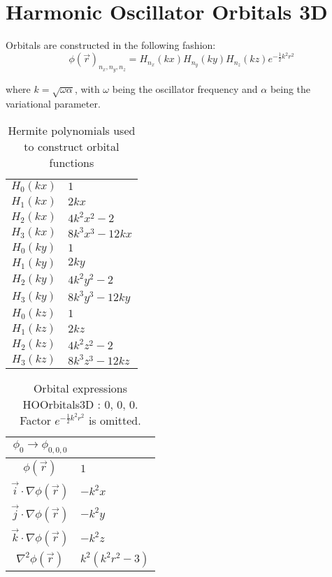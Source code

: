 \chapter{Harmonic Oscillator Orbitals 3D}
\label{appendix:SymPyHO3D}

Orbitals are constructed in the following fashion:
\begin{equation*}
\phi(\vec r)_{n_x, n_y, n_z} = H_{n_x}(kx)H_{n_y}(ky)H_{n_z}(kz)e^{-\frac{1}{2}k^2r^2}
\end{equation*}   

where $k = \sqrt{\omega\alpha}$, with $\omega$ being the oscillator frequency and $\alpha$ being the variational parameter.  


\begin{table}
\begin{center}
\begin{tabular}{c|l}
$H_{0}(kx)$ & $1$\\
$H_{1}(kx)$ & $2 k x$\\
$H_{2}(kx)$ & $4 k^{2} x^{2} -2$\\
$H_{3}(kx)$ & $8 k^{3} x^{3} - 12 k x$\\
\hline
$H_{0}(ky)$ & $1$\\
$H_{1}(ky)$ & $2 k y$\\
$H_{2}(ky)$ & $4 k^{2} y^{2} -2$\\
$H_{3}(ky)$ & $8 k^{3} y^{3} - 12 k y$\\
\hline
$H_{0}(kz)$ & $1$\\
$H_{1}(kz)$ & $2 k z$\\
$H_{2}(kz)$ & $4 k^{2} z^{2} -2$\\
$H_{3}(kz)$ & $8 k^{3} z^{3} - 12 k z$\\
\end{tabular}
\caption{Hermite polynomials used to construct orbital functions}
\end{center}
\end{table}

\clearpage

\begin{table}
\begin{center}
\begin{tabular}{c|l}
$\phi_{0} \rightarrow \phi_{0, 0, 0}$\\
\hline
$\phi(\vec r)$ & $1$\\
\hline
$\vec i\cdot \nabla \phi(\vec r)$ & $- k^{2} x$\\
$\vec j\cdot \nabla \phi(\vec r)$ & $- k^{2} y$\\
$\vec k\cdot \nabla \phi(\vec r)$ & $- k^{2} z$\\
\hline
$\nabla^2 \phi(\vec r)$ & $k^{2} \left(k^{2} r^{2} -3\right)$\\
\end{tabular}
\caption{Orbital expressions HOOrbitals3D : 0, 0, 0. Factor $e^{- \frac{1}{2} k^{2} r^{2}}$ is omitted.}
\end{center}
\end{table}


